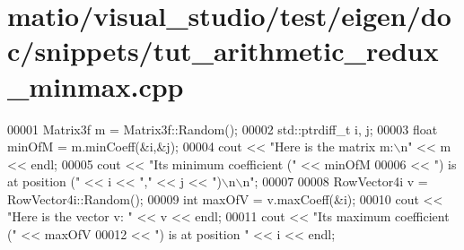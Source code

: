 \hypertarget{matio_2visual__studio_2test_2eigen_2doc_2snippets_2tut__arithmetic__redux__minmax_8cpp_source}{}\section{matio/visual\+\_\+studio/test/eigen/doc/snippets/tut\+\_\+arithmetic\+\_\+redux\+\_\+minmax.cpp}
\label{matio_2visual__studio_2test_2eigen_2doc_2snippets_2tut__arithmetic__redux__minmax_8cpp_source}

\begin{DoxyCode}
00001   Matrix3f m = Matrix3f::Random();
00002   std::ptrdiff\_t i, j;
00003   \textcolor{keywordtype}{float} minOfM = m.minCoeff(&i,&j);
00004   cout << \textcolor{stringliteral}{"Here is the matrix m:\(\backslash\)n"} << m << endl;
00005   cout << \textcolor{stringliteral}{"Its minimum coefficient ("} << minOfM 
00006        << \textcolor{stringliteral}{") is at position ("} << i << \textcolor{stringliteral}{","} << j << \textcolor{stringliteral}{")\(\backslash\)n\(\backslash\)n"};
00007 
00008   RowVector4i v = RowVector4i::Random();
00009   \textcolor{keywordtype}{int} maxOfV = v.maxCoeff(&i);
00010   cout << \textcolor{stringliteral}{"Here is the vector v: "} << v << endl;
00011   cout << \textcolor{stringliteral}{"Its maximum coefficient ("} << maxOfV 
00012        << \textcolor{stringliteral}{") is at position "} << i << endl;
\end{DoxyCode}
